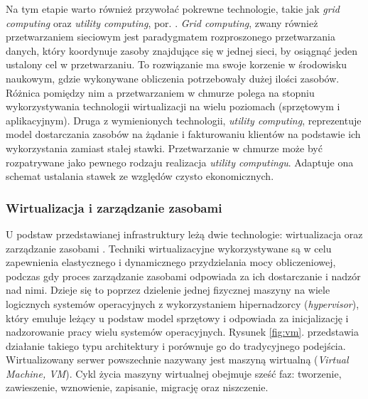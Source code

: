 \documentclass[12pt,a4paper,twoside]{article}
\begin{document}
Na tym etapie warto również przywołać pokrewne technologie, takie jak \textit{grid computing} oraz \textit{utility computing}, por. \citet{zhang2010}. \textit{Grid computing}, zwany również przetwarzaniem sieciowym jest paradygmatem rozproszonego przetwarzania danych, który koordynuje zasoby znajdujące się w jednej sieci, by osiągnąć jeden ustalony cel w przetwarzaniu. To rozwiązanie ma swoje korzenie w środowisku naukowym, gdzie wykonywane obliczenia potrzebowały dużej ilości zasobów. Różnica pomiędzy nim a przetwarzaniem w chmurze polega na stopniu wykorzystywania technologii wirtualizacji na wielu poziomach (sprzętowym i aplikacyjnym). Druga z wymienionych technologii, \textit{utility computing}, reprezentuje model dostarczania zasobów na żądanie i fakturowaniu klientów na podstawie ich wykorzystania zamiast stałej stawki. Przetwarzanie w chmurze może być rozpatrywane jako pewnego rodzaju realizacja \textit{utility computingu}. Adaptuje ona schemat ustalania stawek ze względów czysto ekonomicznych.

\subsubsection{Wirtualizacja i zarządzanie zasobami}

\noindent
U podstaw przedstawianej infrastruktury leżą dwie technologie: wirtualizacja oraz zarządzanie zasobami \citep{mustafa2015}. Techniki wirtualizacyjne wykorzystywane są w celu zapewnienia elastycznego i dynamicznego przydzielania mocy obliczeniowej, podczas gdy proces zarządzanie zasobami odpowiada za ich dostarczanie i nadzór nad nimi. Dzieje się to poprzez dzielenie jednej fizycznej maszyny na wiele logicznych systemów operacyjnych z wykorzystaniem hipernadzorcy (\textit{hypervisor}), który emuluje leżący u podstaw model sprzętowy i odpowiada za inicjalizację i nadzorowanie pracy wielu systemów operacyjnych. Rysunek \ref{fig:vm}. przedstawia działanie takiego typu architektury i porównuje go do tradycyjnego podejścia. Wirtualizowany serwer powszechnie nazywany jest maszyną wirtualną (\textit{Virtual Machine, VM}). Cykl życia maszyny wirtualnej obejmuje sześć faz: tworzenie, zawieszenie, wznowienie, zapisanie, migrację oraz niszczenie.
\end{document}
